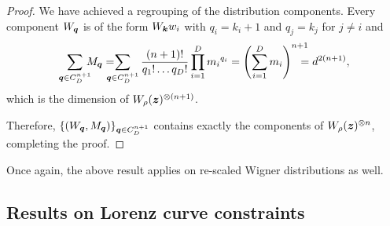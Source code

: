 \documentclass[pra,
aps,
twocolumn,
superscriptaddress,
groupedaddress,
nofootinbib,
reprint
]{revtex4-1}
\begin{document}
\begin{proof}
We have achieved a regrouping of the distribution components.
Every component $W_{\bm{q}}$ is of the form $W_{\bm{k}} w_i$ with $q_i = k_i + 1$ and $q_j = k_j$ for $j\neq i$ and 
\begin{align*}
	\sum_{\bmq \in C_D^{n+1}}  \hspace{-6pt} M_{\bmq} =  \hspace{-10pt} \sum_{\bmq \in C_D^{n+1}} \frac{(n+1)!}{q_1!\dots q_D!} \prod\limits_{i=1}^D {m_i}^{q_i} = 
	\left( \sum_{i=1}^D m_i \right)^{n+1} \hspace{-10pt} = d^{2(n+1)},
\end{align*}
which is the dimension of $W_{\rho}(\bm{z})^{\otimes (n+1)}$.

Therefore, $\{ (W_{\bm{q}}, M_{\bm{q}}) \}_{\bm{q} \in C_D^{n+1}}$ contains exactly the components of $W_{\rho}(\bm{z})^{\otimes n}$, completing the proof.
\end{proof}
Once again, the above result applies on re-scaled Wigner distributions as well.

\subsection{Results on Lorenz curve constraints}
\label{app:lc_constraints}
\end{document}
